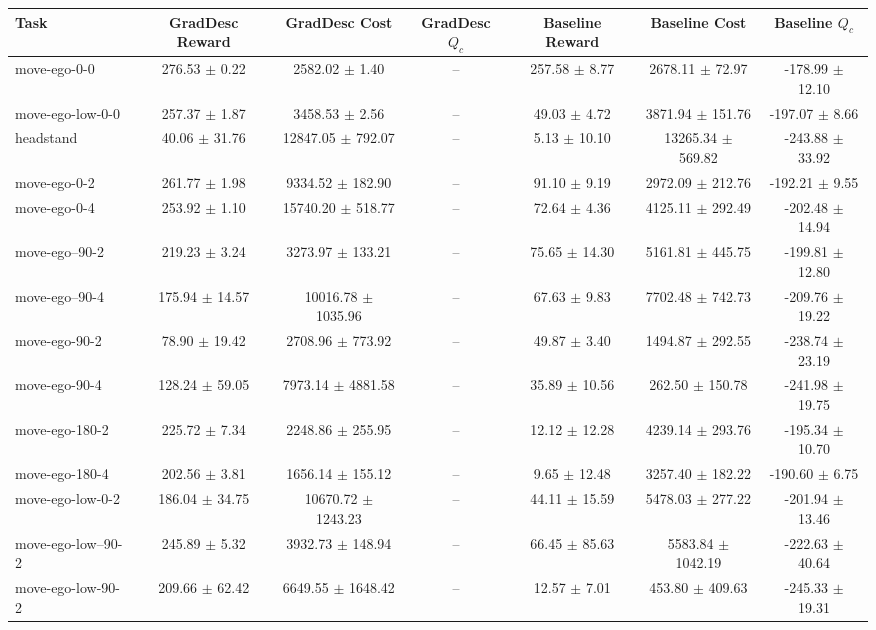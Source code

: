 \begin{tabular}{|lcccccc|}
\hline
Task & GradDesc Reward & GradDesc Cost & GradDesc $Q_c$ & Baseline Reward & Baseline Cost & Baseline $Q_c$ \\
\hline
move-ego-0-0 & 276.53 $\pm$ 0.22 & 2582.02 $\pm$ 1.40 & -- & 257.58 $\pm$ 8.77 & 2678.11 $\pm$ 72.97 & -178.99 $\pm$ 12.10 \\
move-ego-low-0-0 & 257.37 $\pm$ 1.87 & 3458.53 $\pm$ 2.56 & -- & 49.03 $\pm$ 4.72 & 3871.94 $\pm$ 151.76 & -197.07 $\pm$ 8.66 \\
headstand & 40.06 $\pm$ 31.76 & 12847.05 $\pm$ 792.07 & -- & 5.13 $\pm$ 10.10 & 13265.34 $\pm$ 569.82 & -243.88 $\pm$ 33.92 \\
move-ego-0-2 & 261.77 $\pm$ 1.98 & 9334.52 $\pm$ 182.90 & -- & 91.10 $\pm$ 9.19 & 2972.09 $\pm$ 212.76 & -192.21 $\pm$ 9.55 \\
move-ego-0-4 & 253.92 $\pm$ 1.10 & 15740.20 $\pm$ 518.77 & -- & 72.64 $\pm$ 4.36 & 4125.11 $\pm$ 292.49 & -202.48 $\pm$ 14.94 \\
move-ego--90-2 & 219.23 $\pm$ 3.24 & 3273.97 $\pm$ 133.21 & -- & 75.65 $\pm$ 14.30 & 5161.81 $\pm$ 445.75 & -199.81 $\pm$ 12.80 \\
move-ego--90-4 & 175.94 $\pm$ 14.57 & 10016.78 $\pm$ 1035.96 & -- & 67.63 $\pm$ 9.83 & 7702.48 $\pm$ 742.73 & -209.76 $\pm$ 19.22 \\
move-ego-90-2 & 78.90 $\pm$ 19.42 & 2708.96 $\pm$ 773.92 & -- & 49.87 $\pm$ 3.40 & 1494.87 $\pm$ 292.55 & -238.74 $\pm$ 23.19 \\
move-ego-90-4 & 128.24 $\pm$ 59.05 & 7973.14 $\pm$ 4881.58 & -- & 35.89 $\pm$ 10.56 & 262.50 $\pm$ 150.78 & -241.98 $\pm$ 19.75 \\
move-ego-180-2 & 225.72 $\pm$ 7.34 & 2248.86 $\pm$ 255.95 & -- & 12.12 $\pm$ 12.28 & 4239.14 $\pm$ 293.76 & -195.34 $\pm$ 10.70 \\
move-ego-180-4 & 202.56 $\pm$ 3.81 & 1656.14 $\pm$ 155.12 & -- & 9.65 $\pm$ 12.48 & 3257.40 $\pm$ 182.22 & -190.60 $\pm$ 6.75 \\
move-ego-low-0-2 & 186.04 $\pm$ 34.75 & 10670.72 $\pm$ 1243.23 & -- & 44.11 $\pm$ 15.59 & 5478.03 $\pm$ 277.22 & -201.94 $\pm$ 13.46 \\
move-ego-low--90-2 & 245.89 $\pm$ 5.32 & 3932.73 $\pm$ 148.94 & -- & 66.45 $\pm$ 85.63 & 5583.84 $\pm$ 1042.19 & -222.63 $\pm$ 40.64 \\
move-ego-low-90-2 & 209.66 $\pm$ 62.42 & 6649.55 $\pm$ 1648.42 & -- & 12.57 $\pm$ 7.01 & 453.80 $\pm$ 409.63 & -245.33 $\pm$ 19.31 \\

\end{tabular}
